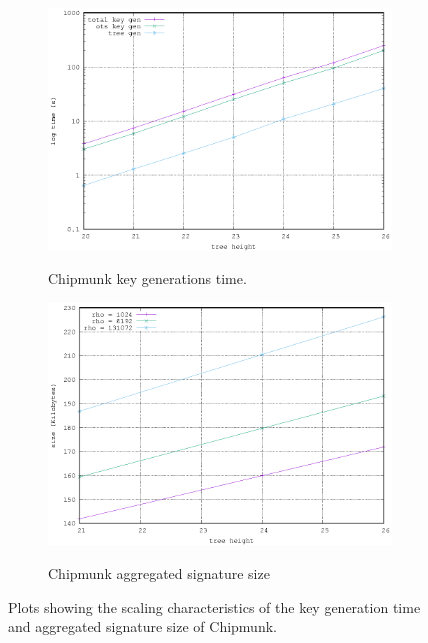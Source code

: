 \begin{figure}[H] 
  \centering
  \begin{subfigure}[b]
  {0.49\textwidth}    \centering
  \includegraphics[trim={1mm 0 4mm 0},clip,width=\textwidth]{figures/key_gen.eps}\\
  \caption{Chipmunk key generations time.}
  \end{subfigure}
\begin{subfigure}[b]{0.49\textwidth}    \centering
  \includegraphics[trim={1mm 0 4mm 0},clip,width=\textwidth]{figures/sig_size.eps}\\
  \caption{Chipmunk aggregated signature size}
  \label{fig:sigize}
  \end{subfigure}
  \caption{Plots showing the scaling characteristics of the key generation time and aggregated signature size of Chipmunk.} \label{fig:keygen}
\end{figure}

